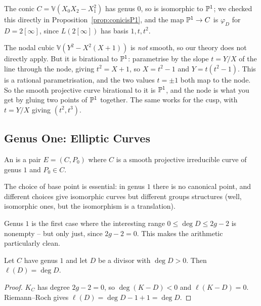\documentclass[a4paper]{scrartcl}
\newcommand{\V}{\mathbb{V}}
\begin{document}
\begin{example}
	The conic $C = \V(X_0X_2-X_1^2)$ has genus $0$, so is isomorphic to $\mathbb{P}^1$; we checked this directly in Proposition~\ref{prop:conicisP1}, and the map $\mathbb{P}^1\to C$ is $\varphi_D$ for $D = 2[\infty]$, since $L(2[\infty])$ has basis $1,t,t^2$.
\end{example}

\begin{example}
	The nodal cubic $\V(Y^2-X^2(X+1))$ is \emph{not} smooth, so our theory does not directly apply. But it is birational to $\mathbb{P}^1$: parametrise by the slope $t = Y/X$ of the line through the node, giving $t^2 = X+1$, so $X = t^2-1$ and $Y = t(t^2-1)$. This is a rational parametrisation, and the two values $t = \pm1$ both map to the node. So the smooth projective curve birational to it is $\mathbb{P}^1$, and the node is what you get by gluing two points of $\mathbb{P}^1$ together. The same works for the cusp, with $t = Y/X$ giving $(t^2,t^3)$.
\end{example}

\subsection{Genus One: Elliptic Curves}

\begin{definition}
	An  is a pair $E = (C,P_0)$ where $C$ is a smooth projective irreducible curve of genus $1$ and $P_0 \in C$.
\end{definition}

The choice of base point is essential: in genus $1$ there is no canonical point, and different choices give isomorphic curves but different groups structures (well, isomorphic ones, but the isomorphism is a translation).

Genus $1$ is the first case where the interesting range $0\leq \deg D \leq 2g-2$ is nonempty -- but only just, since $2g-2 = 0$. This makes the arithmetic particularly clean.

\begin{corollary}\label{cor:g1RR}
	Let $C$ have genus $1$ and let $D$ be a divisor with $\deg D > 0$. Then $\ell(D) = \deg D$.
\end{corollary}

\begin{proof}
	$K_C$ has degree $2g-2 = 0$, so $\deg(K-D) < 0$ and $\ell(K-D) = 0$. Riemann--Roch gives $\ell(D) = \deg D - 1 + 1 = \deg D$.
\end{proof}
\end{document}
